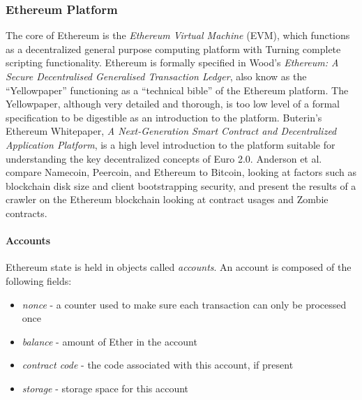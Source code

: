 \documentclass[a4paper,12pt]{article} %
\begin{document}
\subsubsection{Ethereum Platform} \label{sssec:2:ethereum:platform}

The core of Ethereum is the \textit{Ethereum Virtual Machine} (EVM), which functions as a decentralized general purpose computing platform with Turning complete scripting functionality. Ethereum is formally specified in Wood's \textit{Ethereum: A Secure Decentralised Generalised Transaction Ledger}\cite{yellowpaper}, also know as the ``Yellowpaper'' functioning as a ``technical bible'' of the Ethereum platform. The Yellowpaper, although very detailed and thorough, is too low level of a formal specification to be digestible as an introduction to the platform. Buterin's Ethereum Whitepaper, \textit{A Next-Generation Smart Contract and Decentralized Application Platform}\cite{whitepaper}, is a high level introduction to the platform suitable for understanding the key decentralized concepts of Euro 2.0.  Anderson et al. compare Namecoin, Peercoin, and Ethereum to Bitcoin, looking at factors such as blockchain disk size and client bootstrapping security, and present the results of a crawler on the Ethereum blockchain looking at contract usages and Zombie contracts\cite{Anderson2016NewKO}.

\paragraph*{Accounts}

Ethereum state is held in objects called \textit{accounts}. An account is composed of the following fields:

\begin{itemize}
	\item \textit{nonce} - a counter used to make sure each transaction can only be processed once
	\item \textit{balance} - amount of Ether in the account
	\item \textit{contract code} - the code associated with this account, if present
	\item \textit{storage} - storage space for this account
\end{itemize}
\end{document}

